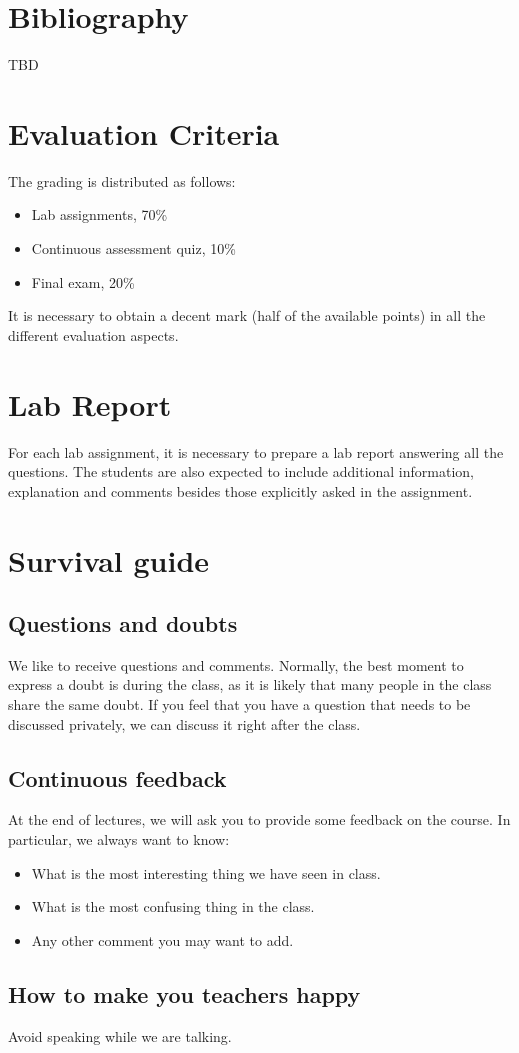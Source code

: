 \section{Bibliography}

TBD

\section{Evaluation Criteria}

The grading is distributed as follows:
\begin{itemize}
\item Lab assignments, 70\%
\item Continuous assessment quiz, 10\%
\item Final exam, 20\%
\end{itemize}

It is necessary to obtain a decent mark (half of the available points)  in all the different evaluation aspects.

\section{Lab Report}
For each lab assignment, it is necessary to prepare a lab report answering all the questions. 
The students are also expected to include additional information, explanation and comments besides those explicitly asked in the assignment.

\section{Survival guide}

\subsection{Questions and doubts}
We like to receive questions and comments.
Normally, the best moment to express a doubt is during the class, as it is likely that many people in the class share the same doubt.
If you feel that you have a question that needs to be discussed privately, we can discuss it right after the class.

\subsection{Continuous feedback}
At the end of lectures, we will ask you to provide some feedback on the course. 
In particular, we always want to know:
\begin{itemize}
\item What is the most interesting thing we have seen in class.
\item What is the most confusing thing in the class.
\item Any other comment you may want to add.

\end{itemize}

\subsection{How to make you teachers happy}

Avoid speaking while we are talking.
